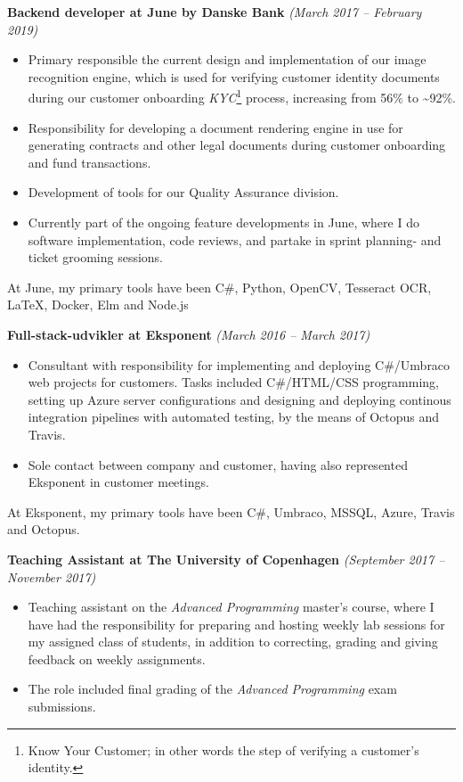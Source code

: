 \documentclass[10pt, a4paper]{article}
\begin{document}
\textbf{Backend developer at June by Danske Bank} \textit{(March 2017 -- February 2019)}
  \begin{itemize}[topsep=0pt]
  \item Primary responsible the current design and
  implementation of our image recognition engine, which is used for
  verifying customer identity documents during our customer onboarding
  \textit{KYC}\footnote{Know Your Customer; in other words the step of verifying a
    customer's identity.} process, increasing from 56\% to \textasciitilde 92\%.

  \item Responsibility for developing a document rendering
  engine in use for generating contracts and other legal documents
  during customer onboarding and fund transactions.

  \item Development of tools for our Quality Assurance division. 

  \item Currently part of the ongoing feature developments in June, where I do
  software implementation, code reviews, and partake in sprint planning- and
  ticket grooming sessions.
  \end{itemize}

  At June, my primary tools have been C\#, Python, OpenCV, Tesseract OCR, LaTeX, Docker, Elm and Node.js

\textbf{Full-stack-udvikler at Eksponent} \textit{(March 2016 -- March 2017)}
  \begin{itemize}[topsep=0pt]
  \item Consultant with responsibility for implementing and deploying
  C\#/Umbraco web projects for customers.
  Tasks included C\#/HTML/CSS programming, setting up Azure server
  configurations and designing and deploying continous
  integration pipelines with automated testing, by the means of Octopus and Travis.

  \item Sole contact between company and
  customer, having also represented Eksponent in customer meetings.
  \end{itemize}

  At Eksponent, my primary tools have been C\#, Umbraco, MSSQL, Azure, Travis
  and Octopus.\\
  \pagebreak

\textbf{Teaching Assistant at The University of Copenhagen} \textit{(September 2017 -- November 2017)}
\begin{itemize}[topsep=0pt]
\item 
  Teaching assistant on the \textit{Advanced Programming} master's course, where
  I have had the responsibility for preparing and hosting weekly lab sessions
  for my assigned class of students, in addition to correcting, grading and
  giving feedback on weekly assignments.
\item
  The role included final grading of the \textit{Advanced Programming}
  exam submissions.
\end{itemize}
\end{document}
